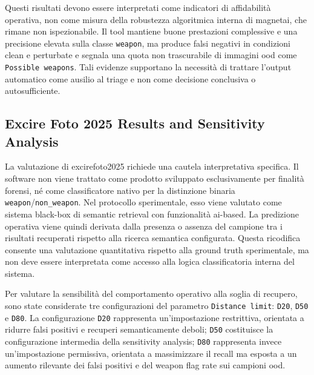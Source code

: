 Questi risultati devono essere interpretati come indicatori di affidabilità
operativa, non come misura della robustezza algoritmica interna di
\gls{magnetai}, che rimane non ispezionabile. Il tool mantiene buone prestazioni
complessive e una precisione elevata sulla classe \texttt{weapon}, ma produce
falsi negativi in condizioni clean e perturbate e segnala una quota non
trascurabile di immagini \gls{ood} come \texttt{Possible weapons}. Tali evidenze
supportano la necessità di trattare l'output automatico come ausilio al triage e
non come decisione conclusiva o autosufficiente.



\subsection{Excire Foto 2025 Results and Sensitivity Analysis}
\label{subsec:results-excire}

La valutazione di \gls{excirefoto2025} richiede una cautela interpretativa
specifica. Il software non viene trattato come prodotto sviluppato esclusivamente
per finalità forensi, né come classificatore nativo per la distinzione binaria
\texttt{weapon}/\texttt{non\_weapon}. Nel protocollo sperimentale, esso viene
valutato come sistema black-box di semantic retrieval con funzionalità
\gls{ai}-based. La predizione operativa viene quindi derivata dalla presenza o
assenza del campione tra i risultati recuperati rispetto alla ricerca semantica
configurata. Questa ricodifica consente una valutazione quantitativa rispetto
alla ground truth sperimentale, ma non deve essere interpretata come accesso alla
logica classificatoria interna del sistema.

Per valutare la sensibilità del comportamento operativo alla soglia di recupero,
sono state considerate tre configurazioni del parametro \texttt{Distance limit}:
\texttt{D20}, \texttt{D50} e \texttt{D80}. La configurazione \texttt{D20}
rappresenta un'impostazione restrittiva, orientata a ridurre falsi positivi e
recuperi semanticamente deboli; \texttt{D50} costituisce la configurazione
intermedia della sensitivity analysis; \texttt{D80} rappresenta invece
un'impostazione permissiva, orientata a massimizzare il recall ma esposta a un
aumento rilevante dei falsi positivi e del weapon flag rate sui campioni
\gls{ood}.

